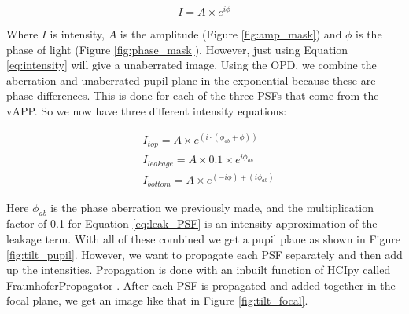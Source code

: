 \begin{equation}
    I = A \times e^{i \phi}
    \label{eq:intensity}
\end{equation}

Where $I$ is intensity, $A$ is the amplitude (Figure \ref{fig:amp_mask}) and $\phi$ is the phase of light (Figure
\ref{fig:phase_mask}).  However, just using Equation \ref{eq:intensity} will give a unaberrated image.  Using the
OPD, we combine the aberration and unaberrated pupil plane in the exponential because these are phase differences. 
This is done for each of the three PSFs that come from the vAPP.  So we now have three different intensity
equations:

\begin{align}
    & I_{top} = A \times e^{(i \cdot (\phi_{ab} + \phi))} \label{eq:top_PSF} \\
    & I_{leakage} = A \times 0.1 \times e^{i \phi_{ab}} \label{eq:leak_PSF} \\
    & I_{bottom} = A \times e^{(-i \phi) + (i \phi_{ab})} \label{eq:bottom_PSF}
\end{align}

Here $\phi_{ab}$ is the phase aberration we previously made, and the multiplication factor of 0.1 for Equation
\ref{eq:leak_PSF} is an intensity approximation of the leakage term.  With all of these combined we get a pupil
plane as shown in Figure \ref{fig:tilt_pupil}.  However, we want to propagate each PSF separately and then add up
the intensities.  Propagation is done with an inbuilt function of HCIpy called FraunhoferPropagator
\cite{por2018hcipy}.  After each PSF is propagated and added together in the focal plane, we get an image like that
in Figure \ref{fig:tilt_focal}.

